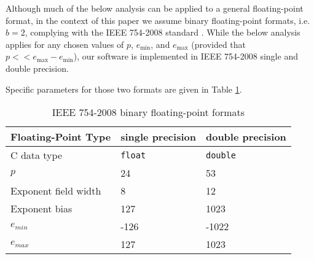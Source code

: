   Although much of the below analysis can be applied to a general floating-point
  format, in the context of this paper we assume binary floating-point formats,
  i.e. $b=2$, complying with the IEEE 754-2008 standard \cite{ieee754}. 
  While the below analysis applies for any chosen values of $p$, $e_{\min}$, and $e_{\max}$ 
  (provided that $p << e_{\max} - e_{\min}$), our software is implemented in IEEE 754-2008
   single and double precision.

  Specific parameters for those two formats are given in Table \ref{tbl:IEEE-754}.
  \begin{table}[!htbp]
    \caption{IEEE 754-2008 binary floating-point formats}
    \label{tbl:IEEE-754}
        \centering
        \begin{tabular}{ | l | l | l | } \hline
            Floating-Point Type & single precision & double precision \\ \hline
            C data type & \texttt{float} & \texttt{double} \\ \hline
            $p$ & 24 & 53 \\ \hline
            Exponent field width & 8 & 12 \\ \hline
            Exponent bias & 127 & 1023 \\ \hline
            $e_{min}$ & -126 & -1022 \\ \hline
            $e_{max}$ & 127 & 1023 \\ \hline
        \end{tabular}
  \end{table}

